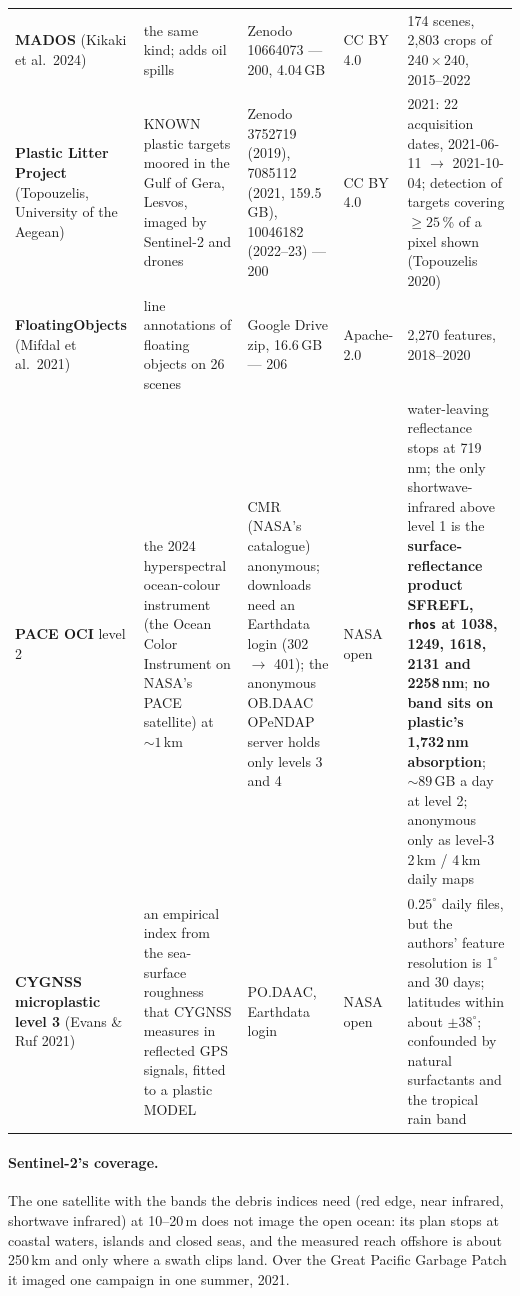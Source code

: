 \documentclass[10pt]{article}
\newcommand{\code}[1]{\texttt{#1}}
\begin{document}
{\begin{longtable}{@{}L{2.3cm}L{3.0cm}L{3.2cm}L{1.9cm}L{5.2cm}@{}}
\addlinespace
\textbf{MADOS} (Kikaki et al.\ 2024) & the same kind; adds oil spills & Zenodo 10664073 --- 200, 4.04\,GB & CC BY 4.0
& 174 scenes, 2,803 crops of $240 \times 240$, 2015--2022 \\
\addlinespace
\textbf{Plastic Litter Project} (Topouzelis, University of the Aegean) & KNOWN plastic targets moored in the Gulf
of Gera, Lesvos, imaged by Sentinel-2 and drones & Zenodo 3752719 (2019), 7085112 (2021, 159.5\,GB), 10046182
(2022--23) --- 200 & CC BY 4.0 & 2021: 22 acquisition dates, 2021-06-11 $\to$ 2021-10-04; detection of targets
covering $\ge 25$\,\% of a pixel shown (Topouzelis 2020) \\
\addlinespace
\textbf{FloatingObjects} (Mifdal et al.\ 2021) & line annotations of floating objects on 26 scenes & Google Drive
zip, 16.6\,GB --- 206 & Apache-2.0 & 2,270 features, 2018--2020 \\
\addlinespace
\textbf{PACE OCI} level 2 & the 2024 hyperspectral ocean-colour instrument (the Ocean Color Instrument on NASA's
PACE satellite) at $\sim 1$\,km & CMR (NASA's catalogue) anonymous; downloads need an Earthdata login (302 $\to$
401); the anonymous OB.DAAC OPeNDAP server holds only levels 3 and 4 & NASA open & water-leaving reflectance stops
at 719\,nm; the only shortwave-infrared above level 1 is the \textbf{surface-reflectance product SFREFL,
\code{rhos} at 1038, 1249, 1618, 2131 and 2258\,nm}; \textbf{no band sits on plastic's 1,732\,nm absorption};
$\sim 89$\,GB a day at level 2; anonymous only as level-3 2\,km / 4\,km daily maps \\
\addlinespace
\textbf{CYGNSS microplastic level 3} (Evans \& Ruf 2021) & an empirical index from the sea-surface roughness that
CYGNSS measures in reflected GPS signals, fitted to a plastic MODEL & PO.DAAC, Earthdata login & NASA open &
$0.25^\circ$ daily files, but the authors' feature resolution is $1^\circ$ and 30 days; latitudes within about
$\pm 38^\circ$; confounded by natural surfactants and the tropical rain band \\
\bottomrule
\end{longtable}}

\paragraph{Sentinel-2's coverage.} The one satellite with the bands the debris indices need (red edge, near
infrared, shortwave infrared) at 10--20\,m does not image the open ocean: its plan stops at coastal waters, islands
and closed seas, and the measured reach offshore is about 250\,km and only where a swath clips land. Over the Great
Pacific Garbage Patch it imaged one campaign in one summer, 2021.
\end{document}
